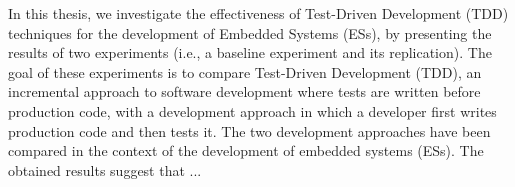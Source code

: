 In this thesis, we investigate the effectiveness of Test-Driven Development (TDD) techniques for the development of Embedded Systems (ESs), by presenting the results of two experiments (i.e., a baseline experiment and its replication). The goal of these experiments is to compare Test-Driven Development (TDD), an incremental approach to software development where tests are written before production code, with a development approach in which a developer first writes production code and then tests it. The two development approaches have been compared in the context of the development of embedded systems (ESs). The obtained results suggest that ...

